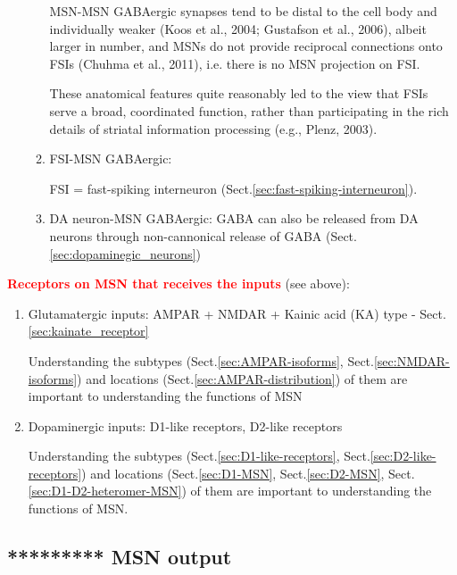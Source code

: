 \begin{enumerate}
\begin{enumerate}
MSN-MSN GABAergic synapses tend to be distal to the cell body and individually
weaker (Koos et al., 2004; Gustafson et al., 2006), albeit larger in number, and
MSNs do not provide reciprocal connections onto FSIs (Chuhma et al., 2011), i.e.
there is no MSN projection on FSI.

These anatomical features quite reasonably led to the view that FSIs serve a
broad, coordinated function, rather than participating in the rich details of
striatal information processing (e.g., Plenz, 2003).
  
  \item FSI-MSN GABAergic:
  
  FSI = fast-spiking interneuron (Sect.\ref{sec:fast-spiking-interneuron}).
  
  \item DA neuron-MSN GABAergic: GABA can also be released from DA neurons
  through non-cannonical release of GABA (Sect.\ref{sec:dopaminegic_neurons})
  
\end{enumerate}
\end{enumerate}

\textcolor{red}{\bf Receptors on MSN that receives the inputs} (see above):
\begin{enumerate}
  \item Glutamatergic inputs: AMPAR + NMDAR + Kainic acid (KA) type -
  Sect.\ref{sec:kainate_receptor}
  
  Understanding the subtypes (Sect.\ref{sec:AMPAR-isoforms},
  Sect.\ref{sec:NMDAR-isoforms}) and locations
  (Sect.\ref{sec:AMPAR-distribution}) of them are important to understanding the
  functions of MSN
  
  \item Dopaminergic inputs: D1-like receptors, D2-like receptors
  
  
  Understanding the subtypes (Sect.\ref{sec:D1-like-receptors},
  Sect.\ref{sec:D2-like-receptors}) and locations
  (Sect.\ref{sec:D1-MSN}, Sect.\ref{sec:D2-MSN},
  Sect.\ref{sec:D1-D2-heteromer-MSN}) of them are important to understanding
  the functions of MSN.
  
\end{enumerate}

\subsection{********* MSN output}
\label{sec:MSN-output}
\label{sec:dSPN}
\label{sec:iSPN}
\label{sec:D1-MSN}
\label{sec:D2-MSN}

